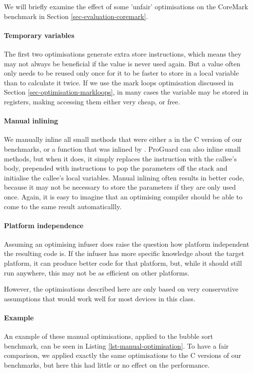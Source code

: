 We will briefly examine the effect of some 'unfair' optimisations on the CoreMark benchmark in Section \ref{sec-evaluation-coremark}.


\paragraph{Temporary variables}
The first two optimisations generate extra store instructions, which means they may not always be beneficial if the value is never used again. But a value often only needs to be reused only once for it to be faster to store in a local variable than to calculate it twice. If we use the mark loops optimisation discussed in Section \ref{sec-optimisation-markloops}, in many cases the variable may be stored in registers, making accessing them either very cheap, or free.

\paragraph{Manual inlining}
We manually inline all small methods that were either a  in the C version of our benchmarks, or a function that was inlined by . ProGuard can also inline small methods, but when it does, it simply replaces the  instruction with the callee's body, prepended with  instructions to pop the parameters off the stack and initialise the callee's local variables. Manual inlining often results in better code, because it may not be necessary to store the parameters if they are only used once. Again, it is easy to imagine that an optimising compiler should be able to come to the same result automaticallly.

\paragraph{Platform independence}
Assuming an optimising infuser does raise the question how platform independent the resulting code is. If the infuser has more specific knowledge about the target platform, it can produce better code for that platform, but, while it should still run anywhere, this may not be as efficient on other platforms.

However, the optimisations described here are only based on very conservative assumptions that would work well for most devices in this class.

\paragraph{Example} An example of these manual optimisations, applied to the bubble sort benchmark, can be seen in Listing \ref{lst-manual-optimisation}. To have a fair comparison, we applied exactly the same optimisations to the C versions of our benchmarks, but here this had little or no effect on the performance.

